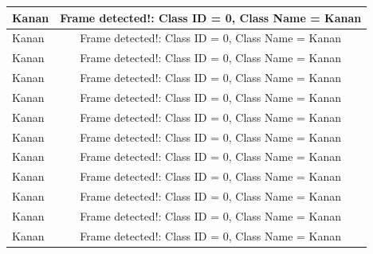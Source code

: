 \begin{longtable}{|l|c|}
  Kanan          & Frame detected!: Class ID = 0, Class Name = Kanan \\ \hline
  Kanan          & Frame detected!: Class ID = 0, Class Name = Kanan \\ \hline
  Kanan          & Frame detected!: Class ID = 0, Class Name = Kanan \\ \hline
  Kanan          & Frame detected!: Class ID = 0, Class Name = Kanan \\ \hline
  Kanan          & Frame detected!: Class ID = 0, Class Name = Kanan \\ \hline
  Kanan          & Frame detected!: Class ID = 0, Class Name = Kanan \\ \hline
  Kanan          & Frame detected!: Class ID = 0, Class Name = Kanan \\ \hline
  Kanan          & Frame detected!: Class ID = 0, Class Name = Kanan \\ \hline
  Kanan          & Frame detected!: Class ID = 0, Class Name = Kanan \\ \hline
  Kanan          & Frame detected!: Class ID = 0, Class Name = Kanan \\ \hline
  Kanan          & Frame detected!: Class ID = 0, Class Name = Kanan \\ \hline
  Kanan          & Frame detected!: Class ID = 0, Class Name = Kanan \\ \hline
\end{longtable}

